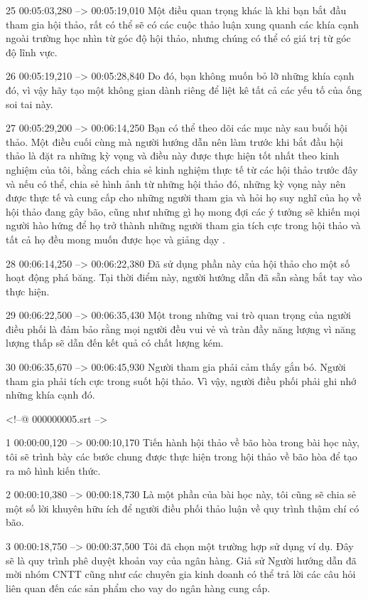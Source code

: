 25
00:05:03,280 --> 00:05:19,010
Một điều quan trọng khác là khi bạn bắt đầu tham gia hội thảo, rất có thể sẽ có các cuộc thảo luận xung quanh các khía cạnh ngoài trường học nhìn từ góc độ hội thảo, nhưng chúng có thể có giá trị từ góc độ lĩnh vực.

26
00:05:19,210 --> 00:05:28,840
Do đó, bạn không muốn bỏ lỡ những khía cạnh đó, vì vậy hãy tạo một không gian dành riêng để liệt kê tất cả các yếu tố của ống soi tai này.

27
00:05:29,200 --> 00:06:14,250
Bạn có thể theo dõi các mục này sau buổi hội thảo.  Một điều cuối cùng mà người hướng dẫn nên làm trước khi bắt đầu hội thảo là đặt ra những kỳ vọng và điều này được thực hiện tốt nhất theo kinh nghiệm của tôi, bằng cách chia sẻ kinh nghiệm thực tế từ các hội thảo trước đây và nếu có thể, chia sẻ hình ảnh từ những hội thảo đó, những kỳ vọng này nên được  thực tế và cung cấp cho những người tham gia và hỏi họ suy nghĩ của họ về hội thảo đang gây bão, cũng như những gì họ mong đợi các ý tưởng sẽ khiến mọi người hào hứng để họ trở thành những người tham gia tích cực trong hội thảo và tất cả họ đều mong muốn được học và giảng dạy  .

28
00:06:14,250 --> 00:06:22,380
Đã sử dụng phần này của hội thảo cho một số hoạt động phá băng.  Tại thời điểm này, người hướng dẫn đã sẵn sàng bắt tay vào thực hiện.

29
00:06:22,500 --> 00:06:35,430
Một trong những vai trò quan trọng của người điều phối là đảm bảo rằng mọi người đều vui vẻ và tràn đầy năng lượng vì năng lượng thấp sẽ dẫn đến kết quả có chất lượng kém.

30
00:06:35,670 --> 00:06:45,930
Người tham gia phải cảm thấy gắn bó.  Người tham gia phải tích cực trong suốt hội thảo.  Vì vậy, người điều phối phải ghi nhớ những khía cạnh đó.

<!--@ 000000005.srt -->

1
00:00:00,120 --> 00:00:10,170
Tiến hành hội thảo về bão hòa trong bài học này, tôi sẽ trình bày các bước chung được thực hiện trong hội thảo về bão hòa để tạo ra mô hình kiến ​​thức.

2
00:00:10,380 --> 00:00:18,730
Là một phần của bài học này, tôi cũng sẽ chia sẻ một số lời khuyên hữu ích để người điều phối thảo luận về quy trình thậm chí có bão.

3
00:00:18,750 --> 00:00:37,500
Tôi đã chọn một trường hợp sử dụng ví dụ.  Đây sẽ là quy trình phê duyệt khoản vay của ngân hàng.  Giả sử Người hướng dẫn đã mời nhóm CNTT cũng như các chuyên gia kinh doanh có thể trả lời các câu hỏi liên quan đến các sản phẩm cho vay do ngân hàng cung cấp.

